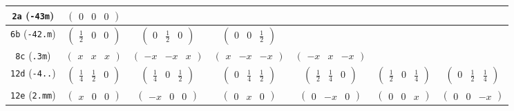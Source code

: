 \documentclass[fleqn,9pt,landscape]{jsarticle}
\begin{document}
\begin{center}
\begin{longtable}{ccccccc}
{\tt 2a} ({\tt -43m}) & $ \begin{pmatrix} 0 & 0 & 0 \end{pmatrix} $ & $  $ & $  $ & $  $ & $  $ & $  $ \\ \hline
{\tt 6b} ({\tt -42.m}) & $ \begin{pmatrix} \frac{1}{2} & 0 & 0 \end{pmatrix} $ & $ \begin{pmatrix} 0 & \frac{1}{2} & 0 \end{pmatrix} $ & $ \begin{pmatrix} 0 & 0 & \frac{1}{2} \end{pmatrix} $ & $  $ & $  $ & $  $ \\ \hline
{\tt 8c} ({\tt .3m}) & $ \begin{pmatrix} x & x & x \end{pmatrix} $ & $ \begin{pmatrix} - x & - x & x \end{pmatrix} $ & $ \begin{pmatrix} x & - x & - x \end{pmatrix} $ & $ \begin{pmatrix} - x & x & - x \end{pmatrix} $ & $  $ & $  $ \\ \hline
{\tt 12d} ({\tt -4..}) & $ \begin{pmatrix} \frac{1}{4} & \frac{1}{2} & 0 \end{pmatrix} $ & $ \begin{pmatrix} \frac{1}{4} & 0 & \frac{1}{2} \end{pmatrix} $ & $ \begin{pmatrix} 0 & \frac{1}{4} & \frac{1}{2} \end{pmatrix} $ & $ \begin{pmatrix} \frac{1}{2} & \frac{1}{4} & 0 \end{pmatrix} $ & $ \begin{pmatrix} \frac{1}{2} & 0 & \frac{1}{4} \end{pmatrix} $ & $ \begin{pmatrix} 0 & \frac{1}{2} & \frac{1}{4} \end{pmatrix} $ \\ \hline
{\tt 12e} ({\tt 2.mm}) & $ \begin{pmatrix} x & 0 & 0 \end{pmatrix} $ & $ \begin{pmatrix} - x & 0 & 0 \end{pmatrix} $ & $ \begin{pmatrix} 0 & x & 0 \end{pmatrix} $ & $ \begin{pmatrix} 0 & - x & 0 \end{pmatrix} $ & $ \begin{pmatrix} 0 & 0 & x \end{pmatrix} $ & $ \begin{pmatrix} 0 & 0 & - x \end{pmatrix} $ \\ \hline

\end{longtable}
\end{center}
\end{document}
